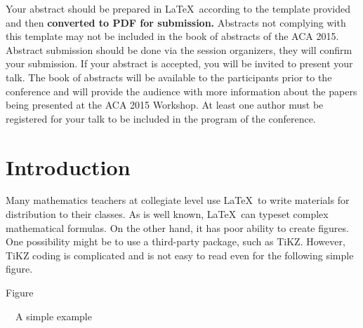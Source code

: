 \documentclass[11pt]{article}
\begin{document}
Your abstract should be prepared in \LaTeX\ according to the template provided
and then \textbf{converted to PDF for submission.}  Abstracts not complying with
this template may not be included in the book of abstracts of the ACA
2015. Abstract submission should be done via the session organizers, they will
confirm your submission. If your abstract is accepted, you will be invited to
present your talk.  The book of abstracts will be available to the participants
prior to the conference and will provide the audience with more information
about the papers being presented at the ACA 2015 Workshop. At least one author
must be registered for your talk to be included in the program of the
conference.

\fi



\setcounter{figno}{1}

\section{Introduction}

Many mathematics teachers at collegiate level use \LaTeX\ to write materials for
distribution to their classes.  As is well known, \LaTeX\ can typeset complex
mathematical formulas.  On the other hand, it has poor ability to create
figures.  One possibility might be to use a third-party package, such as TiKZ.
However, TiKZ coding is complicated and is not easy to read
even for the following simple figure.

\begin{center}


Figure \thefigno\addtocounter{figno}{1}\ \ A simple example%
\end{center}

\vspace{-2mm}

\end{document}
